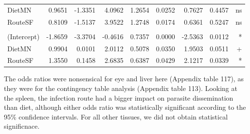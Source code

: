 \documentclass[
  12pt,
  letterpaper,
]{article}
\begin{document}
\begin{longtable}{l|rrrrrrrr}
DietMN & 0.9651 & -1.3351 & 4.0962 & 1.2654 & 0.0252 & 0.7627 & 0.4457 & ns \\ 
RouteSF & 0.8109 & -1.5137 & 3.9522 & 1.2748 & 0.0174 & 0.6361 & 0.5247 & ns \\ 
\midrule\addlinespace[2.5pt]
\multicolumn{9}{l}{Spleen} \\ 
\midrule\addlinespace[2.5pt]
(Intercept) & -1.8659 & -3.3704 & -0.4616 & 0.7357 & 0.0000 & -2.5363 & 0.0112 & * \\ 
DietMN & 0.9904 & 0.0101 & 2.0112 & 0.5078 & 0.0350 & 1.9503 & 0.0511 & + \\ 
RouteSF & 1.3550 & 0.1458 & 2.6835 & 0.6387 & 0.0429 & 2.1217 & 0.0339 & * \\ 
\bottomrule
\end{longtable}

The odds ratios were nonsensical for eye and liver here (Appendix table 117), as they were for the contingency table analysis (Appendix table 113). Looking at the spleen, the infection route had a bigger impact on parasite dissemination than diet, although either odds ratio was statistically significant according to the 95\% confidence intervals. For all other tissues, we did not obtain statistical significnace.
\end{document}
